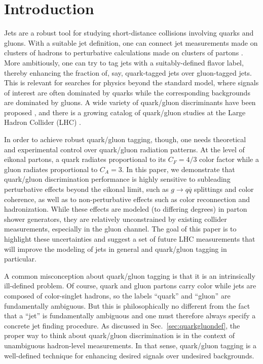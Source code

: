 \documentclass[11pt,letterpaper]{article}
\DeclareRobustCommand{\Sec}[1]{Sec.~\ref{#1}}
\begin{document}
\section{Introduction}
\label{introduction}

Jets are a robust tool for studying short-distance collisions involving quarks and gluons.  With a suitable jet definition, one can connect jet measurements made on clusters of hadrons to perturbative calculations made on clusters of partons \cite{}.  More ambitiously, one can try to tag jets with a suitably-defined flavor label, thereby enhancing the fraction of, say, quark-tagged jets over gluon-tagged jets.  This is relevant for searches for physics beyond the standard model, where signals of interest are often dominated by quarks while the corresponding backgrounds are dominated by gluons.  A wide variety of quark/gluon discriminants have been proposed \cite{}, and there is a growing catalog of quark/gluon studies at the Large Hadron Collider (LHC) \cite{}.

In order to achieve robust quark/gluon tagging, though, one needs theoretical and experimental control over quark/gluon radiation patterns.  At the level of eikonal partons, a quark radiates proportional to its $C_F = 4/3$ color factor while a gluon radiates proportional to $C_A = 3$.  In this paper, we demonstrate that quark/gluon discrimination performance is highly sensitive to subleading perturbative effects beyond the eikonal limit, such as $g \to q \overline{q}$ splittings and color coherence, as well as to non-perturbative effects such as color reconnection and hadronization.   While these effects are modeled (to differing degrees) in parton shower generators, they are relatively unconstrained by existing collider measurements, especially in the gluon channel.  The goal of this paper is to highlight these uncertainties and suggest a set of future LHC measurements that will improve the modeling of jets in general and quark/gluon tagging in particular.

A common misconception about quark/gluon tagging is that it is an intrinsically ill-defined problem.  Of course, quark and gluon partons carry color while jets are composed of color-singlet hadrons, so the labels ``quark'' and ``gluon'' are fundamentally ambiguous.  But this is philosophically no different from the fact that a ``jet'' is fundamentally ambiguous and one must therefore always specify a concrete jet finding procedure.  As discussed in \Sec{sec:quarkgluondef}, the proper way to think about quark/gluon discrimination is in the context of unambiguous hadron-level measurements.  In that sense, quark/gluon tagging is a well-defined technique for enhancing desired signals over undesired backgrounds.
\end{document}
